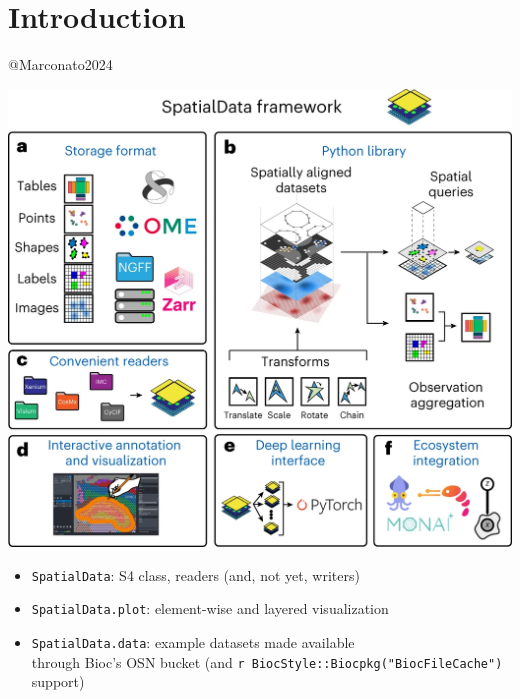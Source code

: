 \documentclass[
  letterpaper,
  DIV=11,
  numbers=noendperiod]{scrreprt}
\providecommand{\tightlist}{%
  \setlength{\itemsep}{0pt}\setlength{\parskip}{0pt}}\usepackage{longtable,booktabs,array}
\begin{document}
\chapter{Introduction}\label{introduction}

@Marconato2024

\includegraphics[width=0.5\linewidth,height=\textheight,keepaspectratio]{pages/images/SpatialData.png}

\begin{itemize}
\tightlist
\item
  \texttt{SpatialData}: S4 class, readers (and, not yet, writers)
\item
  \texttt{SpatialData.plot}: element-wise and layered visualization
\item
  \texttt{SpatialData.data}: example datasets made available\\
  through Bioc's OSN bucket (and
  \texttt{r\ BiocStyle::Biocpkg("BiocFileCache")} support)
\end{itemize}
\end{document}
